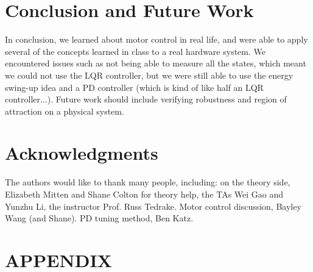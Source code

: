 \documentclass[conference]{IEEEtran}
\begin{document}
\section{Conclusion and Future Work}

In conclusion, we learned about motor control in real life, and were able to
apply several of the concepts learned in class to a real hardware system. We
encountered issues such as not being able to measure all the states, which meant
we could not use the LQR controller, but we were still able to use the energy
swing-up idea and a PD controller (which is kind of like half an LQR
controller...). Future work should include verifying robustness and region of
attraction on a physical system.

\newpage
\section*{Acknowledgments}

The authors would like to thank many people, including: on the theory side,
Elizabeth Mitten and Shane Colton for theory help, the TAs Wei Gao and Yunzhu
Li, the instructor Prof. Russ Tedrake. Motor control discussion, Bayley Wang
(and Shane). PD tuning method, Ben Katz.




\bibdata




\clearpage

\section*{APPENDIX}
\end{document}
